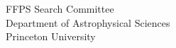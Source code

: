 \documentclass[12pt]{letter}
\begin{document}
\begin{letter}{
               FFPS Search Committee \\
               Department of Astrophysical Sciences \\
               Princeton University
           }


\end{letter}
\end{document}
